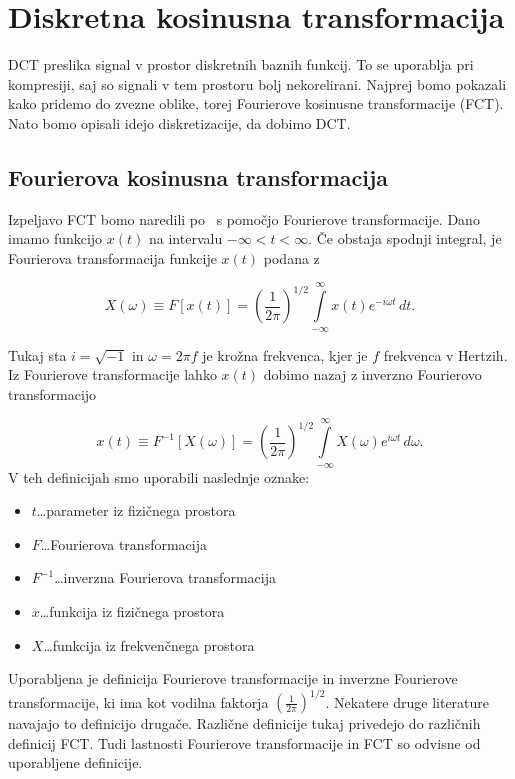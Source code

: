 \documentclass[a4paper,12pt,openright]{book}
\begin{document}
\chapter{Diskretna kosinusna transformacija} 
\label{DCT}
DCT preslika signal v prostor diskretnih baznih funkcij. To se uporablja pri kompresiji, saj so signali v tem prostoru bolj nekorelirani. Najprej bomo pokazali kako pridemo do zvezne oblike, torej Fourierove kosinusne transformacije (FCT). Nato bomo opisali idejo diskretizacije, da dobimo DCT. 
\section{Fourierova kosinusna transformacija}%
Izpeljavo FCT bomo naredili po~\cite{britanak2010discrete} s pomočjo Fourierove transformacije. Dano imamo funkcijo $x(t)$ na intervalu $-\infty < t < \infty$. Če obstaja spodnji integral, je Fourierova transformacija funkcije $x(t)$ podana z

\begin{equation}
X(\omega) \equiv F[x(t)] = \left( \frac{1}{2 \pi} \right)^{1/2} \int\limits_{-\infty}^{\infty} x(t) e^{-i \omega t} \,dt.
\label{eq:FT}
\end{equation}

Tukaj sta $i = \sqrt{-1}$ in $\omega = 2 \pi f$ je krožna frekvenca, kjer je $f$ frekvenca v Hertzih.  Iz Fourierove transformacije lahko $x(t)$ dobimo nazaj z inverzno Fourierovo transformacijo

\begin{equation}
x(t) \equiv F^{-1}[X(\omega)] = \left( \frac{1}{2 \pi} \right)^{1/2} \int\limits_{-\infty}^{\infty} X(\omega) e^{i \omega t} \,d\omega.
\label{eq:IFT}
\end{equation}
V teh definicijah smo uporabili naslednje oznake:
\begin{itemize}
  \item $t$\ldots parameter iz fizičnega prostora
  \item $F$\ldots Fourierova transformacija
  \item $F^{-1}$\ldots inverzna Fourierova transformacija
  \item $x$\ldots funkcija iz fizičnega prostora
  \item $X$\ldots funkcija iz frekvenčnega prostora
  
\end{itemize}
Uporabljena je definicija Fourierove transformacije in inverzne Fourierove transformacije, ki ima kot vodilna faktorja $\left( \frac{1}{2 \pi} \right)^{1/2}$. Nekatere druge literature navajajo to definicijo drugače. Različne definicije tukaj privedejo do različnih definicij FCT. Tudi lastnosti Fourierove transformacije in FCT so odvisne od uporabljene definicije.\par
\end{document}
